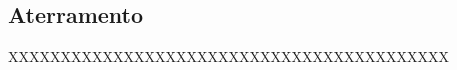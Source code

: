 \subsection{Aterramento} \label{section: grounding}

XXXXXXXXXXXXXXXXXXXXXXXXXXXXXXXXXXXXXXXXXX

%

%

%
\newpage
